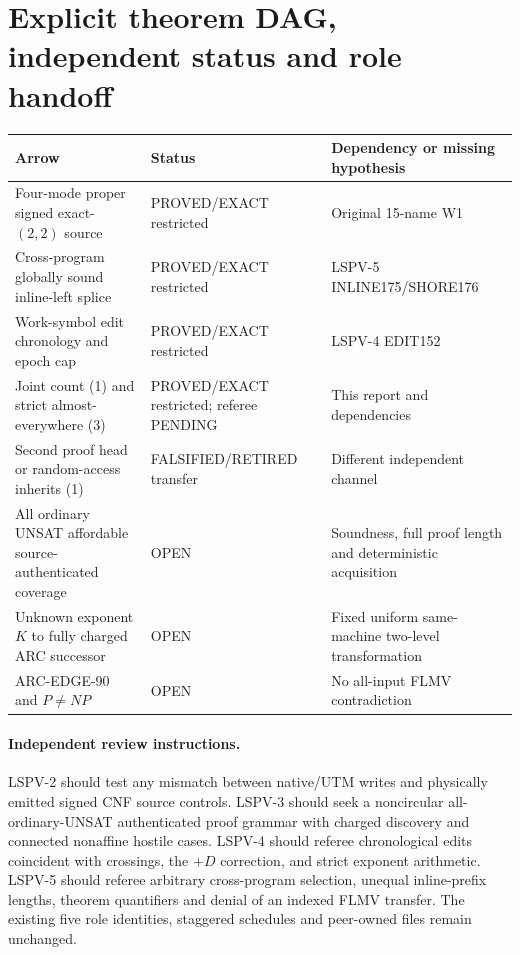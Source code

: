 \documentclass[11pt]{article}
\begin{document}
\section{Explicit theorem DAG, independent status and role handoff}
\begin{center}\small\begin{tabularx}{.97\linewidth}{p{.38\linewidth}p{.23\linewidth}X}\toprule
Arrow & Status & Dependency or missing hypothesis\\\midrule
Four-mode proper signed exact-$(2,2)$ source & PROVED/EXACT restricted & Original 15-name W1\\
Cross-program globally sound inline-left splice & PROVED/EXACT restricted & LSPV-5 INLINE175/SHORE176\\
Work-symbol edit chronology and epoch cap & PROVED/EXACT restricted & LSPV-4 EDIT152\\
Joint count (1) and strict almost-everywhere (3) & PROVED/EXACT restricted; referee PENDING & This report and dependencies\\
Second proof head or random-access inherits (1) & FALSIFIED/RETIRED transfer & Different independent channel\\
All ordinary UNSAT affordable source-authenticated coverage & OPEN & Soundness, full proof length and deterministic acquisition\\
Unknown exponent $K$ to fully charged ARC successor & OPEN & Fixed uniform same-machine two-level transformation\\
ARC-EDGE-90 and $P\ne NP$ & OPEN & No all-input FLMV contradiction\\\bottomrule\end{tabularx}\end{center}

\paragraph{Independent review instructions.}
LSPV-2 should test any mismatch between native/UTM writes and physically emitted signed CNF source controls. LSPV-3 should seek a noncircular all-ordinary-UNSAT authenticated proof grammar with charged discovery and connected nonaffine hostile cases. LSPV-4 should referee chronological edits coincident with crossings, the $+D$ correction, and strict exponent arithmetic. LSPV-5 should referee arbitrary cross-program selection, unequal inline-prefix lengths, theorem quantifiers and denial of an indexed FLMV transfer. The existing five role identities, staggered schedules and peer-owned files remain unchanged.
\end{document}
